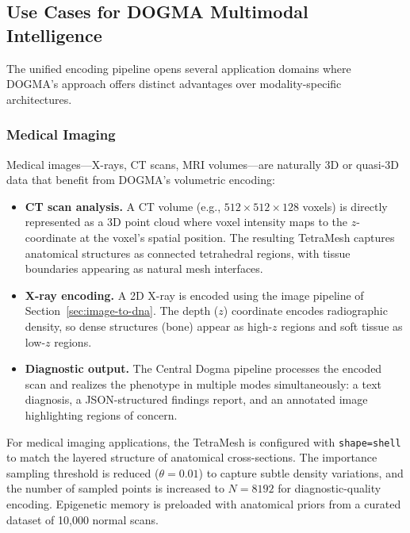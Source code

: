 \subsection{Use Cases for DOGMA Multimodal Intelligence}
\label{sec:dogma-use-cases}

The unified encoding pipeline opens several application domains where DOGMA's approach offers distinct advantages over modality-specific architectures.

\subsubsection{Medical Imaging}

Medical images---X-rays, CT scans, MRI volumes---are naturally 3D or quasi-3D data that benefit from DOGMA's volumetric encoding:

\begin{itemize}[leftmargin=1.5em]
  \item \textbf{CT scan analysis.} A CT volume (e.g., $512 \times 512 \times 128$ voxels) is directly represented as a 3D point cloud where voxel intensity maps to the $z$-coordinate at the voxel's spatial position. The resulting TetraMesh captures anatomical structures as connected tetrahedral regions, with tissue boundaries appearing as natural mesh interfaces.
  \item \textbf{X-ray encoding.} A 2D X-ray is encoded using the image pipeline of Section~\ref{sec:image-to-dna}. The depth ($z$) coordinate encodes radiographic density, so dense structures (bone) appear as high-$z$ regions and soft tissue as low-$z$ regions.
  \item \textbf{Diagnostic output.} The Central Dogma pipeline processes the encoded scan and realizes the phenotype in multiple modes simultaneously: a text diagnosis, a JSON-structured findings report, and an annotated image highlighting regions of concern.
\end{itemize}

\begin{implnote}
For medical imaging applications, the TetraMesh is configured with \texttt{shape=shell} to match the layered structure of anatomical cross-sections. The importance sampling threshold is reduced ($\theta = 0.01$) to capture subtle density variations, and the number of sampled points is increased to $N = 8192$ for diagnostic-quality encoding. Epigenetic memory is preloaded with anatomical priors from a curated dataset of 10,000 normal scans.
\end{implnote}

